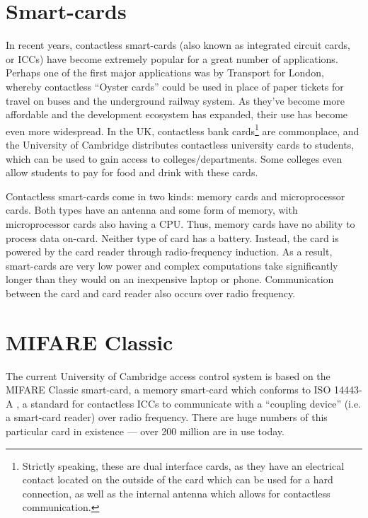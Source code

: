 \documentclass[12pt,a4paper,twoside,openright]{report}
\begin{document}
\section{Smart-cards}

In recent years, contactless smart-cards (also known as integrated circuit cards, or ICCs) have become extremely popular for a great number of applications. Perhaps one of the first major applications was by Transport for London, whereby contactless ``Oyster cards'' could be used in place of paper tickets for travel on buses and the underground railway system. As they've become more affordable and the development ecosystem has expanded, their use has become even more widespread. In the UK, contactless bank cards\footnote{Strictly speaking, these are dual interface cards, as they have an electrical contact located on the outside of the card which can be used for a hard connection, as well as the internal antenna which allows for contactless communication.} are commonplace, and the University of Cambridge distributes contactless university cards to students, which can be used to gain access to colleges/departments. Some colleges even allow students to pay for food and drink with these cards.

Contactless smart-cards come in two kinds: memory cards and microprocessor cards. Both types have an antenna and some form of memory, with microprocessor cards also having a CPU. Thus, memory cards have no ability to process data on-card. Neither type of card has a battery. Instead, the card is powered by the card reader through radio-frequency induction. As a result, smart-cards are very low power and complex computations take significantly longer than they would on an inexpensive laptop or phone. Communication between the card and card reader also occurs over radio frequency.

\section{MIFARE Classic}
\label{sec:mifareclassic}

The current University of Cambridge access control system is based on the MIFARE Classic smart-card, a memory smart-card which conforms to ISO 14443-A \cite{ISO14443}, a standard for contactless ICCs to communicate with a ``coupling device'' (i.e. a smart-card reader) over radio frequency. There are huge numbers of this particular card in existence --- over 200 million are in use today.
\end{document}

